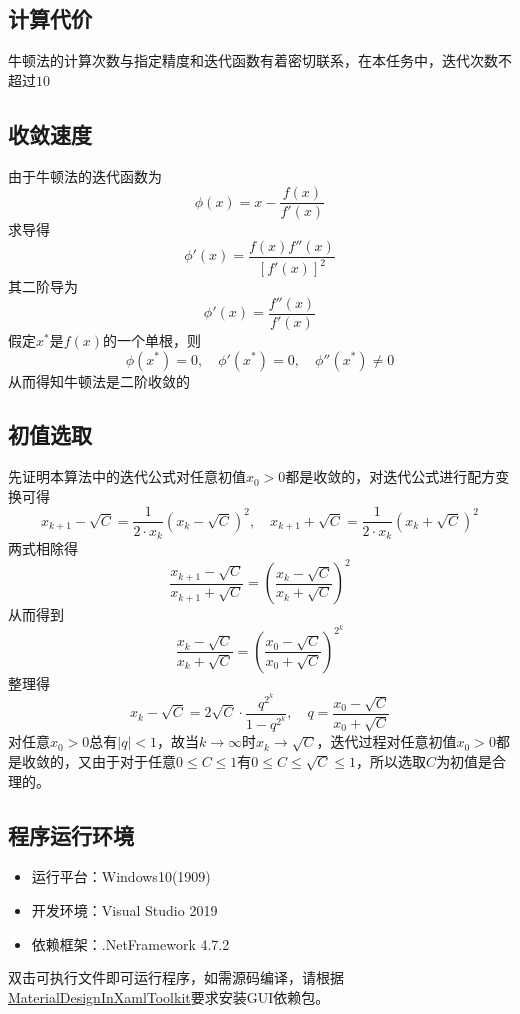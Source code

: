\documentclass[lang=cn,11pt,a4paper]{elegantpaper}
\begin{document}
\subsection{计算代价}
牛顿法的计算次数与指定精度和迭代函数有着密切联系，在本任务中，迭代次数不超过$10$
\subsection{收敛速度}
由于牛顿法的迭代函数为
\begin{equation}
  \phi(x)=x-\frac{f(x)}{f'(x)}
\end{equation}
求导得
\begin{equation}
  \phi '(x)=\frac{f(x)f''(x)}{[f'(x)]^2}
\end{equation}
其二阶导为
\begin{equation}
  \phi '(x)=\frac{f''(x)}{f'(x)}
\end{equation}
假定$x^*$是$f(x)$的一个单根，则
\begin{equation}
  \phi (x^*)=0,\quad \phi '(x^*)=0,\quad \phi ''(x^*)\neq 0
\end{equation}
从而得知牛顿法是二阶收敛的
\subsection{初值选取}
先证明本算法中的迭代公式对任意初值$x_0>0$都是收敛的，对迭代公式进行配方变换可得
\begin{equation}
  x_{k+1}-\sqrt{C}=\frac{1}{2\cdot x_k} (x_k-\sqrt{C})^2,\quad x_{k+1}+\sqrt{C}=\frac{1}{2\cdot x_k} (x_k+\sqrt{C})^2
\end{equation}
两式相除得
\begin{equation}
  \frac{x_{k+1}-\sqrt{C}}{x_{k+1}+\sqrt{C}}=\left(\frac{x_k-\sqrt{C}}{x_k+\sqrt{C}}\right)^2
\end{equation}
从而得到
\begin{equation}
  \frac{x_{k}-\sqrt{C}}{x_{k}+\sqrt{C}}=\left(\frac{x_0-\sqrt{C}}{x_0+\sqrt{C}}\right)^{2^k}
\end{equation}
整理得
\begin{equation}
  x_{k}-\sqrt{C}=2\sqrt{C}\cdot \frac{q^{2^k}}{1-q^{2^k}},\quad q=\frac{x_0-\sqrt{C}}{x_0+\sqrt{C}}
\end{equation}
对任意$x_0>0$总有$|q|<1$，故当$k\rightarrow \infty$时$x_k\rightarrow \sqrt{C}$，迭代过程对任意初值$x_0>0$都是收敛的，又由于对于任意$0\leq C \leq 1$有$0 \leq C \leq \sqrt{C} \leq 1$，所以选取$C$为初值是合理的。
\subsection{程序运行环境}
\begin{itemize}
  \item 运行平台：Windows10(1909)
  \item 开发环境：Visual Studio 2019
  \item 依赖框架：.NetFramework 4.7.2
\end{itemize}
双击可执行文件即可运行程序，如需源码编译，请根据\href{https://github.com/MaterialDesignInXAML/MaterialDesignInXamlToolkit}{MaterialDesignInXamlToolkit}要求安装GUI依赖包。
\end{document}
